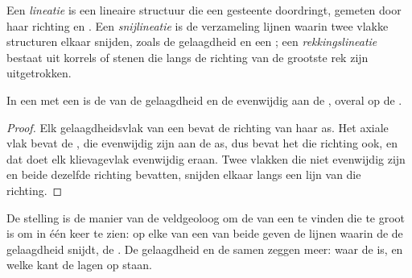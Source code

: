 \begin{definition}\label{def:b1:faults-folds-fabrics:lineation}
Een \emph{lineatie} is een lineaire structuur die een gesteente doordringt, gemeten door haar richting en . Een \emph{snijlineatie} is de verzameling lijnen waarin twee vlakke structuren elkaar snijden, zoals de gelaagdheid en een ; een \emph{rekkingslineatie} bestaat uit korrels of stenen die langs de richting van de grootste rek zijn uitgetrokken.
\end{definition}

\begin{proposition}\label{prop:b1:faults-folds-fabrics:intersection}
In een  met een  is de  van de gelaagdheid en de  evenwijdig aan de , overal op de .
\end{proposition}

\begin{proof}
Elk gelaagdheidsvlak van een  bevat de richting van haar as. Het axiale vlak bevat de , die evenwijdig zijn aan de as, dus bevat het die richting ook, en dat doet elk klievagevlak evenwijdig eraan. Twee vlakken die niet evenwijdig zijn en beide dezelfde richting bevatten, snijden elkaar langs een lijn van die richting.
\end{proof}

De stelling is de manier van de veldgeoloog om de  van een  te vinden die te groot is om in één keer te zien: op elke  van een van beide  geven de lijnen waarin de  de gelaagdheid snijdt, de . De gelaagdheid en de  samen zeggen meer: waar de  is, en welke kant de lagen op staan.

